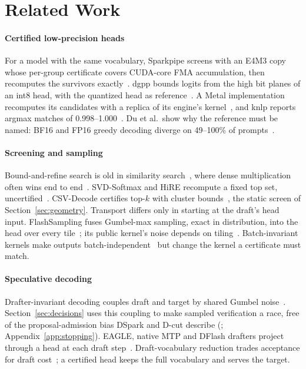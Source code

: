 \section{Related Work}\label{sec:related}\label{sec:prior}
\paragraph{Certified low-precision heads}\label{sec:prior-certified} For a model with the same vocabulary, Sparkpipe screens with an E4M3 copy whose per-group certificate covers CUDA-core FMA accumulation, then recomputes the survivors exactly~\cite{sparkpipehead}. dgpp bounds logits from the high bit planes of an int8 head, with the quantized head as reference~\cite{dgpphead}. A Metal implementation recomputes its candidates with a replica of its engine's kernel~\cite{lagunaprune}, and knlp reports argmax matches of 0.998--1.000~\cite{knlphead}. Du et al.\ show why the reference must be named: BF16 and FP16 greedy decoding diverge on 49--100\% of prompts~\cite{precisioninvariant}.

\paragraph{Screening and sampling} Bound-and-refine search is old in similarity search~\cite{vafile,fexipro,lemp,ramgray2012}, where dense multiplication often wins end to end~\cite{maximus}. SVD-Softmax and HiRE recompute a fixed top set, uncertified~\cite{svdsoftmax,hire}. CSV-Decode certifies top-$k$ with cluster bounds~\cite{csvdecode}, the static screen of Section~\ref{sec:geometry}. Transport differs only in starting at the draft's head input. FlashSampling fuses Gumbel-max sampling, exact in distribution, into the head over every tile~\cite{flashsampling}; its public kernel's noise depends on tiling~\cite{flashsamplingcode}. Batch-invariant kernels make outputs batch-independent~\cite{he2025nondeterminism,sglangdeterministic} but change the kernel a certificate must match.

\paragraph{Speculative decoding} Drafter-invariant decoding couples draft and target by shared Gumbel noise~\cite{daliri2025,rowan2025}. Section~\ref{sec:decisions} uses this coupling to make sampled verification a race, free of the proposal-admission bias DSpark and D-cut describe (\citealp{dspark,dcut}; Appendix~\ref{app:stopping}). EAGLE, native MTP and DFlash drafters project through a head at each draft step~\cite{eagle,gloeckle2024,dflashpaper}. Draft-vocabulary reduction trades acceptance for draft cost~\cite{frspec,vocabtrim,specvocab}; a certified head keeps the full vocabulary and serves the target.

